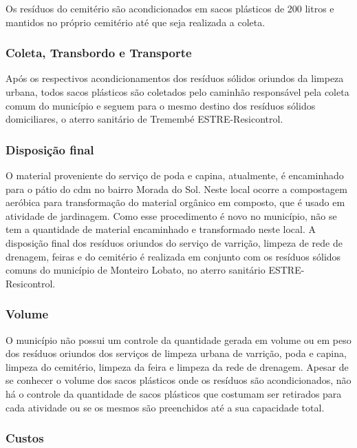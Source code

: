 Os resíduos do cemitério são acondicionados em sacos plásticos de 200 litros e mantidos no próprio cemitério até que seja realizada a coleta.

\subsubsection{Coleta, Transbordo e Transporte}

Após os respectivos acondicionamentos dos resíduos sólidos oriundos da limpeza urbana, todos sacos plásticos são coletados pelo caminhão responsável pela coleta comum do município e seguem para o mesmo destino dos resíduos sólidos domiciliares, o aterro sanitário de Tremembé ESTRE-Resicontrol.

\subsubsection{Disposição final}
O material proveniente do serviço de poda e capina, atualmente, é encaminhado para o pátio do \gls{cdm} no bairro Morada do Sol. Neste local ocorre a compostagem aeróbica para transformação do material orgânico em composto, que é usado em atividade de jardinagem. Como esse procedimento é novo no município, não se tem a quantidade de material encaminhado e transformado neste local. 
A disposição final dos resíduos oriundos do serviço de varrição, limpeza de rede de drenagem, feiras e do cemitério é realizada em conjunto com os resíduos sólidos comuns do município de Monteiro Lobato, no aterro sanitário ESTRE-Resicontrol.

\subsubsection{Volume}

O município não possui um controle da quantidade gerada em volume ou em peso dos resíduos oriundos dos serviços de limpeza urbana de varrição, poda e capina, limpeza do cemitério, limpeza da feira e limpeza da rede de drenagem.
Apesar de se conhecer o volume dos sacos plásticos onde os resíduos são acondicionados, não há o controle da quantidade de sacos plásticos que costumam ser retirados para cada atividade ou se os mesmos são preenchidos até a sua capacidade total.

\subsubsection{Custos}

